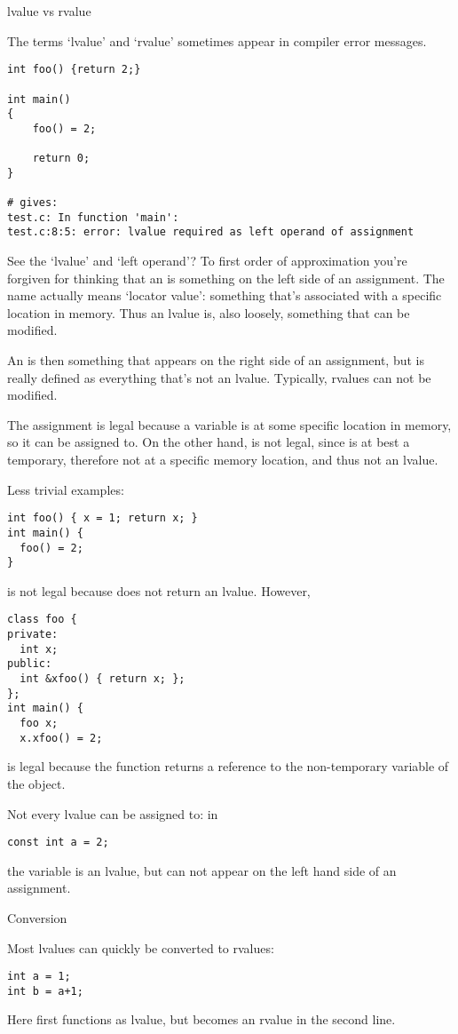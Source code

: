  {lvalue vs rvalue}
\label{sec:lrvalue}

The terms `lvalue' and `rvalue' sometimes appear in compiler error
messages.
\begin{verbatim}
int foo() {return 2;}

int main()
{
    foo() = 2;

    return 0;
}

# gives:
test.c: In function 'main':
test.c:8:5: error: lvalue required as left operand of assignment
\end{verbatim}

See the `lvalue' and `left operand'? To first order of approximation
you're forgiven for thinking that an  is something
on the left side of an assignment. The name actually means `locator
value': something that's associated with a specific location in
memory. Thus an lvalue is, also loosely, something that can be modified.

An  is then something that appears on the right
side of an assignment, but is really defined as everything that's not
an lvalue. Typically, rvalues can not be modified.

The assignment  is legal because a variable  is at some specific
location in memory, so it can be assigned to. On the other hand,
 is not legal, since  is at best a temporary,
therefore not at a specific memory location, and thus not an lvalue.

Less trivial examples:
\begin{verbatim}
int foo() { x = 1; return x; }
int main() {
  foo() = 2;
}
\end{verbatim}
is not legal because  does not return an lvalue. However,
\begin{verbatim}
class foo {
private:
  int x;
public:
  int &xfoo() { return x; };
};
int main() {
  foo x;
  x.xfoo() = 2;
\end{verbatim}
is legal because the function  returns a reference to the
non-temporary variable  of the  object.

Not every lvalue can be assigned to: in
\begin{verbatim}
const int a = 2;
\end{verbatim}
the variable  is an lvalue, but can not appear on the left hand
side of an assignment.

 {Conversion}

Most lvalues can quickly be converted to rvalues:
\begin{verbatim}
int a = 1;
int b = a+1;
\end{verbatim}
Here  first functions as lvalue, but becomes an rvalue in the
second line.

